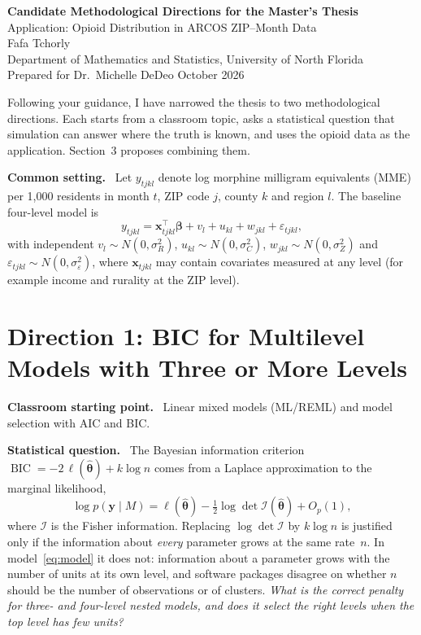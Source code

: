 \documentclass[10pt]{article}
\newcommand{\para}[1]{\textbf{#1}\ }
\DeclareMathOperator{\BIC}{BIC}
\begin{document}
\begin{center}
  {\Large\bfseries Candidate Methodological Directions for the Master's Thesis}\\[0.6ex]
  {\large Application: Opioid Distribution in ARCOS ZIP--Month Data}\\[1.2ex]
  Fafa Tchorly\\
  Department of Mathematics and Statistics, University of North Florida\\[0.3ex]
  Prepared for Dr.\ Michelle DeDeo \quad\textbullet{} October 2026
\end{center}

\vspace{0.5ex}
Following your guidance, I have narrowed the thesis to two methodological directions. Each starts from a classroom topic, asks a statistical question that simulation can answer where the truth is known, and uses the opioid data as the application. Section~3 proposes combining them.

\para{Common setting.} Let $y_{tjkl}$ denote log morphine milligram equivalents (MME) per 1{,}000 residents in month $t$, ZIP code $j$, county $k$ and region $l$. The baseline four-level model is
\begin{equation}\label{eq:model}
  y_{tjkl} = \bm{x}_{tjkl}^{\top}\bm{\beta} + v_l + u_{kl} + w_{jkl} + \varepsilon_{tjkl},
\end{equation}
with independent $v_l \sim N(0,\sigma^2_R)$, $u_{kl} \sim N(0,\sigma^2_C)$, $w_{jkl} \sim N(0,\sigma^2_Z)$ and $\varepsilon_{tjkl} \sim N(0,\sigma^2_\varepsilon)$, where $\bm{x}_{tjkl}$ may contain covariates measured at any level (for example income and rurality at the ZIP level).

\section{Direction 1: BIC for Multilevel Models with Three or More Levels}

\para{Classroom starting point.} Linear mixed models (ML/REML) and model selection with AIC and BIC.

\para{Statistical question.} The Bayesian information criterion $\BIC = -2\,\ell(\hat{\bm\theta}) + k \log n$ comes from a Laplace approximation to the marginal likelihood,
\begin{equation}\label{eq:laplace}
  \log p(\bm{y}\mid M) = \ell(\hat{\bm\theta}) - \tfrac12 \log\det \mathcal{I}(\hat{\bm\theta}) + O_p(1),
\end{equation}
where $\mathcal{I}$ is the Fisher information. Replacing $\log\det\mathcal{I}$ by $k\log n$ is justified only if the information about \emph{every} parameter grows at the same rate~$n$. In model~\eqref{eq:model} it does not: information about a parameter grows with the number of units at its own level, and software packages disagree on whether $n$ should be the number of observations or of clusters. \emph{What is the correct penalty for three- and four-level nested models, and does it select the right levels when the top level has few units?}
\end{document}
